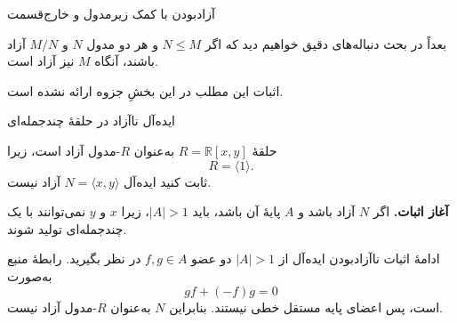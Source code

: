 \begin{frame}[t]{آزادبودن با کمک زیرمدول و خارج‌قسمت}
    \label{lec09:free-extension-preview}
    \begin{remark}
        بعداً در بحث دنباله‌های دقیق خواهیم دید که اگر $N\leqslant M$ و
        هر دو مدول $N$ و $M/N$ آزاد باشند، آنگاه $M$ نیز آزاد است.
    \end{remark}
    اثبات این مطلب در این بخشِ جزوه ارائه نشده است.
\end{frame}

\begin{frame}[t]{ایده‌آل ناآزاد در حلقهٔ چندجمله‌ای}
    \label{lec09:polynomial-ideal}
    \begin{example}
        حلقهٔ $R=\mathbb R[x,y]$ به‌عنوان $R$-مدول آزاد است، زیرا
        \[
            R=\langle1\rangle.
        \]
        ثابت کنید ایده‌آل $N=\langle x,y\rangle$ آزاد نیست.
    \end{example}
    \textbf{آغاز اثبات.} اگر $N$ آزاد باشد و $A$ پایهٔ آن باشد، باید
    $|A|>1$، زیرا $x$ و $y$ نمی‌توانند با یک چندجمله‌ای تولید شوند.
\end{frame}

\begin{frame}[t]{ادامهٔ اثبات ناآزادبودن ایده‌آل}
    \label{lec09:polynomial-ideal-proof}
    از $|A|>1$ دو عضو $f,g\in A$ در نظر بگیرید. رابطهٔ منبع به‌صورت
    \[
        gf+(-f)g=0
    \]
    است، پس اعضای پایه مستقل خطی نیستند. بنابراین $N$ به‌عنوان $R$-مدول
    آزاد نیست.
\end{frame}
